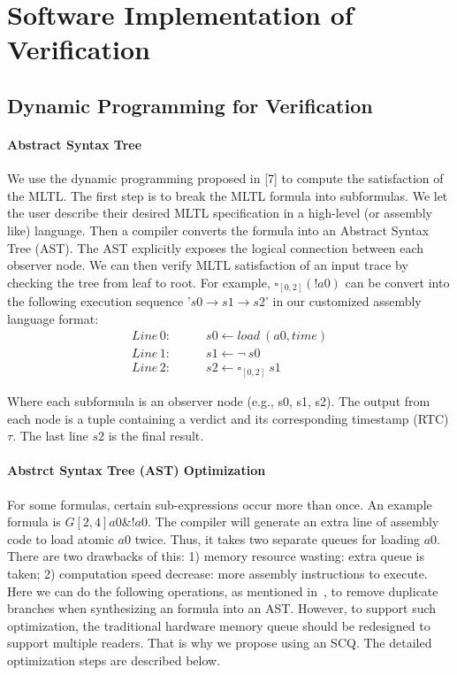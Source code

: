 \chapter{Software Implementation of \mltl Verification}

\section*{Dynamic Programming for \mltl Verification}


\subsubsection{Abstract Syntax Tree}
We use the dynamic programming proposed in [7] to compute the satisfaction of the MLTL. The first step is to break the MLTL formula into subformulas. We let the user describe their desired MLTL specification in a high-level (or assembly like) language. Then a compiler converts the formula into an Abstract Syntax Tree (AST). The AST explicitly exposes the logical connection between each observer node. We can then verify MLTL satisfaction of an input trace by checking the tree from leaf to root. For example, $\square_{[0,2]}(!a0)$ can be convert into the following execution sequence '$s0\rightarrow s1\rightarrow s2$' in our customized assembly language format:
\begin{equation*}
\begin{split}
 Line\, 0:\qquad & s0 \leftarrow load\: (a0,time)\\
 Line\, 1:\qquad & s1 \leftarrow \neg\: s0\\
 Line\, 2:\qquad & s2 \leftarrow \square_{[0,2]}\: s1
\end{split}
\end{equation*}

Where each subformula is an observer node (e.g., s0, s1, s2). The output from each node is a tuple containing a verdict and its corresponding timestamp (RTC) $\tau$. The last line $s2$ is the final result.

\subsubsection{Abstrct Syntax Tree (AST) Optimization}
For some \mltl formulas, certain sub-expressions occur more than once. An example formula is $G[2,4]a0\&!a0$. The compiler will generate an extra line of assembly code to load atomic $a0$ twice. Thus, it takes two separate queues for loading $a0$. There are two drawbacks of this: 1) memory resource wasting: extra queue is taken; 2) computation speed decrease: more assembly instructions to execute. Here we can do the following operations, as mentioned in~\cite{jakvsic2015signal}, to remove duplicate branches when synthesizing an \mltl formula into an AST. However, to support such optimization, the traditional hardware memory queue should be redesigned to support multiple readers. That is why we propose using an SCQ. The detailed optimization steps are described below. \par

